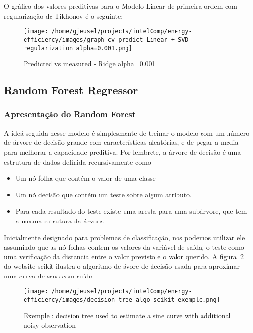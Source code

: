 \documentclass[paper=a4, fontsize=11pt]{article} %
\numberwithin{equation}{section} %
\numberwithin{figure}{section} %
\numberwithin{table}{section} %
\begin{document}
O gráfico dos valores preditivas para o Modelo Linear de primeira ordem com regularização de Tikhonov é o seguinte:
\begin{figure}[H] %
\begin{center}
\texttt{[image: /home/gjeusel/projects/intelComp/energy-efficiency/images/graph\_cv\_predict\_Linear + SVD regularization alpha=0.001.png]}
\end{center}
\caption{Predicted vs measured - Ridge alpha=0.001}
\label{PvsM_Linear_Ridge}
\end{figure}


\subsection{Random Forest Regressor}

\subsubsection{Apresentação do Random Forest}
A ideá seguida nesse modelo é simplesmente de treinar o modelo com um número de árvore de decisão grande com características aleatórias,
e de pegar a media para melhorar a capacidade preditiva.
Por lembrete, a árvore de decisão é uma estrutura de dados definida recursivamente como:
\begin{itemize}
\item Um nó folha que contém o valor de uma classe
\item Um nó decisão que contém um teste sobre algum atributo.
\item Para cada resultado do teste existe uma aresta para uma subárvore, que tem a mesma estrutura da árvore.
\end{itemize}

Inicialmente designado para problemas de classificação, nos podemos utilizar ele assumindo que as nó folhas contem os valores da variável de saída,
o teste como uma verificação da distancia entre o valor previsto e o valor querido.
A figura~\ref{exemple_scikit_decisionTree} do website scikit ilustra o algoritmo de ávore de decisão usada para aproximar uma curva de seno com ruído.

\begin{figure}[H] %
\begin{center}
\texttt{[image: /home/gjeusel/projects/intelComp/energy-efficiency/images/decision tree algo scikit exemple.png]}
\end{center}
\caption{Exemple : decision tree used to estimate a sine curve with additional noisy observation}
\label{exemple_scikit_decisionTree}
\end{figure}
\end{document}
